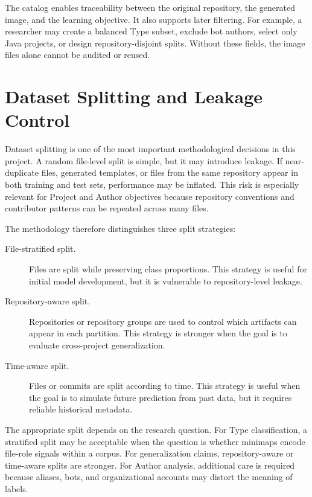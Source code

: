 The catalog enables traceability between the original repository, the generated
image, and the learning objective. It also supports later filtering. For
example, a researcher may create a balanced Type subset, exclude bot authors,
select only Java projects, or design repository-disjoint splits. Without these
fields, the image files alone cannot be audited or reused.

\section{Dataset Splitting and Leakage Control}

Dataset splitting is one of the most important methodological decisions in this
project. A random file-level split is simple, but it may introduce leakage. If
near-duplicate files, generated templates, or files from the same repository
appear in both training and test sets, performance may be inflated. This risk is
especially relevant for Project and Author objectives because repository
conventions and contributor patterns can be repeated across many files.

The methodology therefore distinguishes three split strategies:

\begin{description}
    \item[File-stratified split.] Files are split while preserving class
    proportions. This strategy is useful for initial model development, but it
    is vulnerable to repository-level leakage.

    \item[Repository-aware split.] Repositories or repository groups are used to
    control which artifacts can appear in each partition. This strategy is
    stronger when the goal is to evaluate cross-project generalization.

    \item[Time-aware split.] Files or commits are split according to time. This
    strategy is useful when the goal is to simulate future prediction from past
    data, but it requires reliable historical metadata.
\end{description}

The appropriate split depends on the research question. For Type classification,
a stratified split may be acceptable when the question is whether minimaps encode
file-role signals within a corpus. For generalization claims, repository-aware
or time-aware splits are stronger. For Author analysis, additional care is
required because aliases, bots, and organizational accounts may distort the
meaning of labels.

